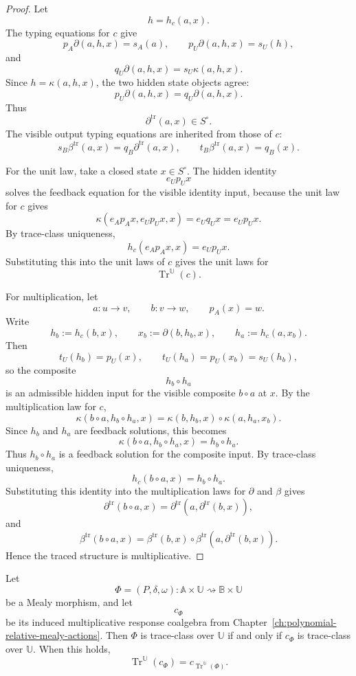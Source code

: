 \begin{proof}
Let
\[
h=h_c(a,x).
\]
The typing equations for \(c\) give
\[
p_A\partial(a,h,x)=s_A(a),
\qquad
p_U\partial(a,h,x)=s_U(h),
\]
and
\[
q_U\partial(a,h,x)=s_U\kappa(a,h,x).
\]
Since \(h=\kappa(a,h,x)\), the two hidden state objects agree:
\[
p_U\partial(a,h,x)
=
q_U\partial(a,h,x).
\]
Thus
\[
\partial^{\operatorname{tr}}(a,x)\in S^\circ.
\]
The visible output typing equations are inherited from those of \(c\):
\[
s_B\beta^{\operatorname{tr}}(a,x)
=
q_B\partial^{\operatorname{tr}}(a,x),
\qquad
t_B\beta^{\operatorname{tr}}(a,x)
=
q_B(x).
\]

For the unit law, take a closed state \(x\in S^\circ\).  The hidden identity
\[
e_Up_Ux
\]
solves the feedback equation for the visible identity input, because the unit
law for \(c\) gives
\[
\kappa(e_Ap_Ax,e_Up_Ux,x)=e_Uq_Ux=e_Up_Ux.
\]
By trace-class uniqueness,
\[
h_c(e_Ap_Ax,x)=e_Up_Ux.
\]
Substituting this into the unit laws of \(c\) gives the unit laws for
\[
\operatorname{Tr}^{\mathbb U}(c).
\]

For multiplication, let
\[
a:u\to v,
\qquad
b:v\to w,
\qquad
p_A(x)=w.
\]
Write
\[
h_b:=h_c(b,x),
\qquad
x_b:=\partial(b,h_b,x),
\qquad
h_a:=h_c(a,x_b).
\]
Then
\[
t_U(h_b)=p_U(x),
\qquad
t_U(h_a)=p_U(x_b)=s_U(h_b),
\]
so the composite
\[
h_b\circ h_a
\]
is an admissible hidden input for the visible composite \(b\circ a\) at \(x\).
By the multiplication law for \(c\),
\[
\kappa(b\circ a,h_b\circ h_a,x)
=
\kappa(b,h_b,x)\circ
\kappa(a,h_a,x_b).
\]
Since \(h_b\) and \(h_a\) are feedback solutions, this becomes
\[
\kappa(b\circ a,h_b\circ h_a,x)
=
h_b\circ h_a.
\]
Thus \(h_b\circ h_a\) is a feedback solution for the composite input.  By
trace-class uniqueness,
\[
h_c(b\circ a,x)=h_b\circ h_a.
\]
Substituting this identity into the multiplication laws for
\(\partial\) and \(\beta\) gives
\[
\partial^{\operatorname{tr}}(b\circ a,x)
=
\partial^{\operatorname{tr}}(a,\partial^{\operatorname{tr}}(b,x)),
\]
and
\[
\beta^{\operatorname{tr}}(b\circ a,x)
=
\beta^{\operatorname{tr}}(b,x)\circ
\beta^{\operatorname{tr}}(a,\partial^{\operatorname{tr}}(b,x)).
\]
Hence the traced structure is multiplicative.
\end{proof}

\begin{proposition}
\label{prop:trace-mealy-induced-coalgebras}
Let
\[
\Phi=(P,\delta,\omega):
\mathbb A\times\mathbb U
\rightsquigarrow
\mathbb B\times\mathbb U
\]
be a Mealy morphism, and let
\[
c_\Phi
\]
be its induced multiplicative response coalgebra from
Chapter~\ref{ch:polynomial-relative-mealy-actions}.  Then \(\Phi\) is
trace-class over \(\mathbb U\) if and only if \(c_\Phi\) is trace-class over
\(\mathbb U\).  When this holds,
\[
\operatorname{Tr}^{\mathbb U}(c_\Phi)
=
c_{\operatorname{Tr}^{\mathbb U}(\Phi)}.
\]
\end{proposition}

